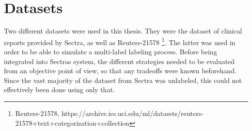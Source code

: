 \section{Datasets}\label{sec:datasets}

Two different datasets were used in this thesis.
They were the dataset of clinical reports provided by Sectra, as well as Reuters-21578 \footnote{Reuters-21578, https://archive.ics.uci.edu/ml/datasets/reuters-21578+text+categorization+collection}.
The latter was used in order to be able to simulate a multi-label labeling process.
Before being integrated into Sectras system, the different strategies needed to be evaluated from an objective point of view, so that any tradeoffs were known beforehand.
Since the vast majority of the dataset from Sectra was unlabeled, this could not effectively been done using only that.

